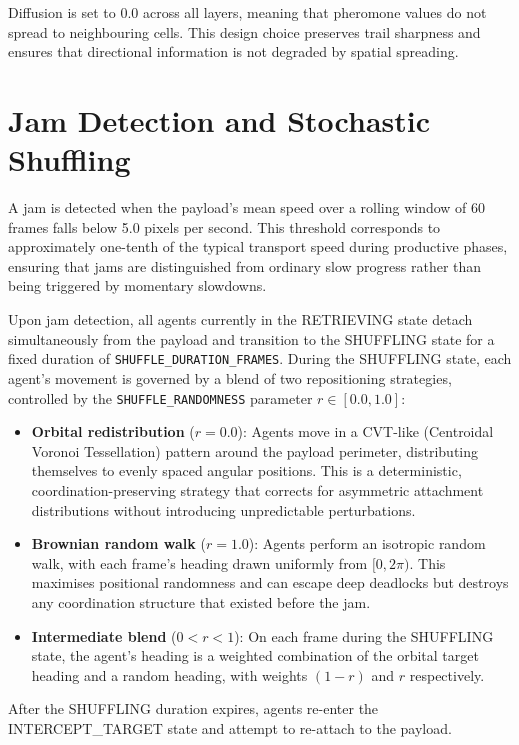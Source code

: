 Diffusion is set to 0.0 across all layers, meaning that pheromone values do not spread to neighbouring cells. This design choice preserves trail sharpness and ensures that directional information is not degraded by spatial spreading.

\section{Jam Detection and Stochastic Shuffling}
\label{sec:jam_shuffling}

A jam is detected when the payload's mean speed over a rolling window of 60 frames falls below 5.0 pixels per second. This threshold corresponds to approximately one-tenth of the typical transport speed during productive phases, ensuring that jams are distinguished from ordinary slow progress rather than being triggered by momentary slowdowns.

Upon jam detection, all agents currently in the RETRIEVING state detach simultaneously from the payload and transition to the SHUFFLING state for a fixed duration of \texttt{SHUFFLE\_DURATION\_FRAMES}. During the SHUFFLING state, each agent's movement is governed by a blend of two repositioning strategies, controlled by the \texttt{SHUFFLE\_RANDOMNESS} parameter $r \in [0.0, 1.0]$:

\begin{itemize}
    \item \textbf{Orbital redistribution} ($r = 0.0$): Agents move in a CVT-like (Centroidal Voronoi Tessellation) pattern around the payload perimeter, distributing themselves to evenly spaced angular positions. This is a deterministic, coordination-preserving strategy that corrects for asymmetric attachment distributions without introducing unpredictable perturbations.
    \item \textbf{Brownian random walk} ($r = 1.0$): Agents perform an isotropic random walk, with each frame's heading drawn uniformly from $[0, 2\pi)$. This maximises positional randomness and can escape deep deadlocks but destroys any coordination structure that existed before the jam.
    \item \textbf{Intermediate blend} ($0 < r < 1$): On each frame during the SHUFFLING state, the agent's heading is a weighted combination of the orbital target heading and a random heading, with weights $(1-r)$ and $r$ respectively.
\end{itemize}

After the SHUFFLING duration expires, agents re-enter the INTERCEPT\_TARGET state and attempt to re-attach to the payload.

